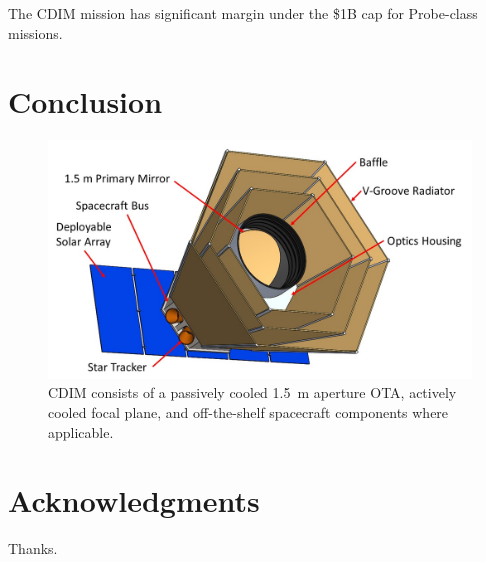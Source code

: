 \documentclass{ws-jai}
\begin{document}
The CDIM mission has significant margin under the \$1B cap for Probe-class missions.

\clearpage

\section{Conclusion}
\label{sec:conclusion}
\begin{figure}[htp]
  \includegraphics[width=\linewidth]{figs/cdim_annotated-cartoon}
  \caption{CDIM consists of a passively cooled \SI{1.5}{\meter} aperture OTA, actively cooled focal plane, and off-the-shelf spacecraft components where applicable. }
\label{fig:cdim-annotated}
\end{figure}
\section*{Acknowledgments}
Thanks.


\end{document}

